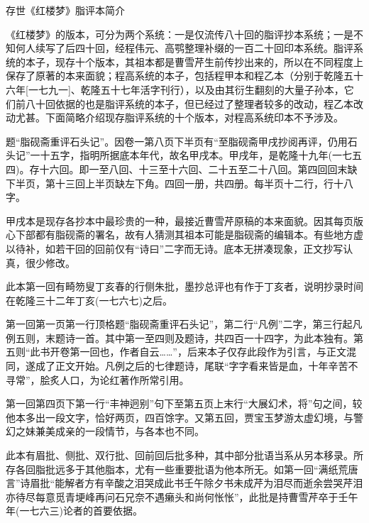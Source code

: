 \newpage

\begin{center}
	{\Huge \heiti 存世《红楼梦》脂评本简介}
\end{center}



《红楼梦》的版本，可分为两个系统：一是仅流传八十回的脂评抄本系统；一是不知何人续写了后四十回，经程伟元、高鹗整理补缀的一百二十回印本系统。脂评系统的本子，现存十个版本，其祖本都是曹雪芹生前传抄出来的，所以在不同程度上保存了原著的本来面貌；程高系统的本子，包括程甲本和程乙本（分别于乾隆五十六年{[}一七九一{]}、乾隆五十七年活字刊行），以及由其衍生翻刻的大量子孙本，它们前八十回依据的也是脂评系统的本子，但已经过了整理者较多的改动，程乙本改动尤甚。下面简略介绍现存脂评系统的十个版本，对程高系统印本不予涉及。

{ }

题“脂砚斋重评石头记”。因卷一第八页下半页有“至脂砚斋甲戌抄阅再评，仍用石头记”一十五字，指明所据底本年代，故名甲戌本。甲戌年，是乾隆十九年(一七五四)。存十六回。即一至八回、十三至十六回、二十五至二十八回。第四回回末缺下半页，第十三回上半页缺左下角。四回一册，共四册。每半页十二行，行十八字。

甲戌本是现存各抄本中最珍贵的一种，最接近曹雪芹原稿的本来面貌。因其每页版心下部都有脂砚斋的署名，故有人猜测其祖本可能是脂砚斋的编辑本。有些地方虚以待补，如若干回的回前仅有“诗曰”二字而无诗。底本无拼凑现象，正文抄写认真，很少修改。

此本第一回有畸笏叟丁亥春的行侧朱批，墨抄总评也有作于丁亥者，说明抄录时间在乾隆三十二年丁亥(一七六七)之后。

第一回第一页第一行顶格题“脂砚斋重评石头记”，第二行“凡例”二字，第三行起凡例五则，末题诗一首。其中第一至四则及题诗，共四百一十四字，为此本独有。第五则“此书开卷第一回也，作者自云\ldots{}\ldots{}”，后来本子仅存此段作为引言，与正文混同，遂成了正文开始。凡例之后的七律题诗，尾联“字字看来皆是血，十年辛苦不寻常”，脍炙人口，为论红著作所常引用。

第一回第四页下第一行“丰神迥别”句下至第五页上末行“大展幻术，将”句之间，较他本多出一段文字，恰好两页，四百馀字。又第五回，贾宝玉梦游太虚幻境，与警幻之妹兼美成亲的一段情节，与各本也不同。

此本有眉批、侧批、双行批、回前回后批多种，其中部分批语当系从另本移录。所存各回脂批远多于其他脂本，尤有一些重要批语为他本所无。如第一回“满纸荒唐言”诗眉批“能解者方有辛酸之泪哭成此书壬午除夕书未成芹为泪尽而逝余尝哭芹泪亦待尽每意觅青埂峰再问石兄奈不遇癞头和尚何怅怅”，此批是持曹雪芹卒于壬午年(一七六三)论者的首要依据。

